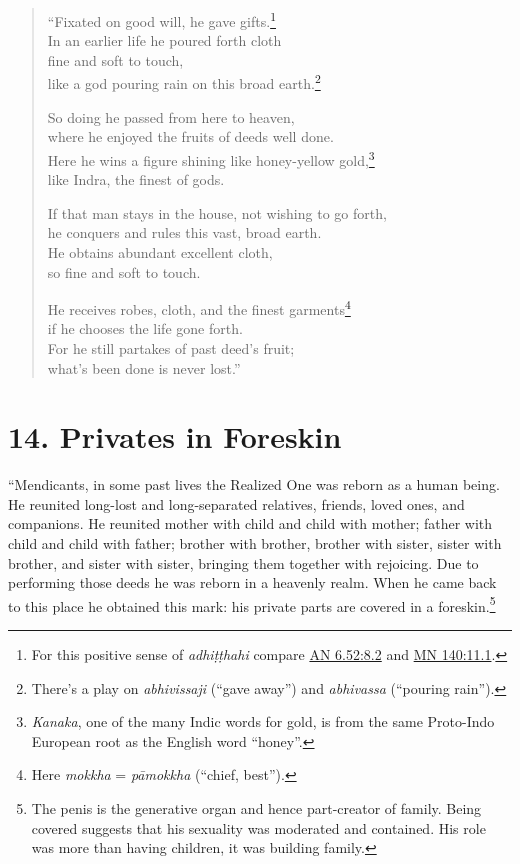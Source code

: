 \documentclass[12pt,openany]{book}%
\begin{document}
\begin{verse}%
“Fixated on good will, he gave gifts.\footnote{For this positive sense of \textit{\textsanskrit{adhiṭṭhahi}} compare \href{https://suttacentral.net/an6.52/en/sujato\#8.2}{AN 6.52:8.2} and \href{https://suttacentral.net/mn140/en/sujato\#11.1}{MN 140:11.1}. } \\
In an earlier life he poured forth cloth \\
fine and soft to touch, \\
like a god pouring rain on this broad earth.\footnote{There’s a play on \textit{abhivissaji} (“gave away”) and \textit{abhivassa} (“pouring rain”). } 

So doing he passed from here to heaven, \\
where he enjoyed the fruits of deeds well done. \\
Here he wins a figure shining like honey-yellow gold,\footnote{\textit{Kanaka}, one of the many Indic words for gold, is from the same Proto-Indo European root as the English word “honey”. } \\
like Indra, the finest of gods. 

If that man stays in the house, not wishing to go forth, \\
he conquers and rules this vast, broad earth. \\
He obtains abundant excellent cloth, \\
so fine and soft to touch. 

He receives robes, cloth, and the finest garments\footnote{Here \textit{mokkha} = \textit{\textsanskrit{pāmokkha}} (“chief, best”). } \\
if he chooses the life gone forth. \\
For he still partakes of past deed’s fruit; \\
what’s been done is never lost.” 

%
\end{verse}

\section*{14. Privates in Foreskin }

“Mendicants, in some past lives the Realized One was reborn as a human being. He reunited long-lost and long-separated relatives, friends, loved ones, and companions. He reunited mother with child and child with mother; father with child and child with father; brother with brother, brother with sister, sister with brother, and sister with sister, bringing them together with rejoicing. Due to performing those deeds he was reborn in a heavenly realm. When he came back to this place he obtained this mark: his private parts are covered in a foreskin.\footnote{The penis is the generative organ and hence part-creator of family. Being covered suggests that his sexuality was moderated and contained. His role was more than having children, it was building family. } 
\end{document}
